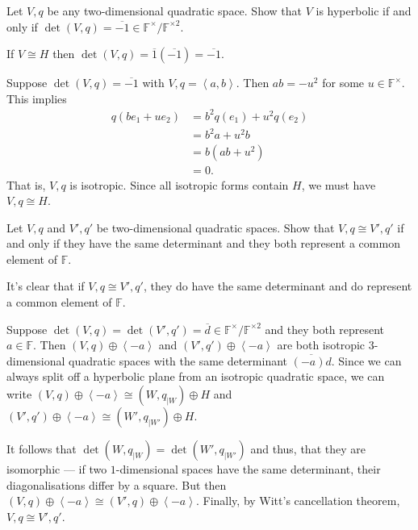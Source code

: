 \documentclass[12 pt, letterpaper]{hmcpset}
\begin{document}
\begin{problem}[(3)]
	Let $V, q$ be any two-dimensional quadratic space. Show that $V$ is hyperbolic if and only if $\operatorname{det}(V, q) = \overline{-1} \in \mathbb{F}^{\times} / \mathbb{F}^{\times 2}$.
\end{problem}

\begin{solution}
	If $V \cong H$ then $\det(V, q) = \overline{1} (\overline{-1}) = \overline{-1}$.

	Suppose $\det(V, q) = \overline{-1}$ with $V, q = \left < a, b \right >$. Then $ab = - u^{2}$ for some $u \in \mathbb{F}^{\times}$. This implies
	\begin{align*}
		q(b e_{1} + u e_{2}) & = b^{2} q(e_{1}) + u^{2} q(e_{2}) \\
				     & = b^{2} a + u^{2} b \\
				     & = b(ab + u^{2}) \\
				     & = 0.
	\end{align*}
	That is, $V, q$ is isotropic. Since all isotropic forms contain $H$, we must have $V, q \cong H$.
\end{solution}

\pagebreak

\begin{problem}[(4)]
	Let $V, q$ and $V', q'$ be two-dimensional quadratic spaces. Show that $V, q \cong V', q'$ if and only if they have the same determinant and they both represent a common element of $\mathbb{F}$.
\end{problem}

\begin{solution}
	It's clear that if $V, q \cong V', q'$, they  do have the same determinant and do represent a common element of $\mathbb{F}$.

	Suppose $\det (V, q) = \det (V', q') = \overline{d} \in \mathbb{F}^{\times} / \mathbb{F}^{\times 2}$ and they both represent $a \in \mathbb{F}$.  Then $(V, q) \oplus \left < -a \right >$ and $(V', q') \oplus \left < -a \right >$ are both isotropic $3$-dimensional quadratic spaces with the same determinant $\overline{(-a)d}$. Since we can always split off a hyperbolic plane from an isotropic quadratic space, we can write $(V, q) \oplus \left < -a \right > \cong (W, q_{\mid W}) \oplus H$ and $(V', q') \oplus \left < -a \right > \cong (W', q_{\mid W'}) \oplus H$. 

	It follows that $\det(W, q_{\mid W}) = \det (W', q_{\mid W'})$ and thus, that they are isomorphic --- if two $1$-dimensional spaces have the same determinant, their diagonalisations differ by a square. But then $(V, q) \oplus \left < -a \right > \cong (V', q) \oplus \left < -a \right >$. Finally, by Witt's cancellation theorem, $V, q \cong V', q'$.
\end{solution}
\end{document}
